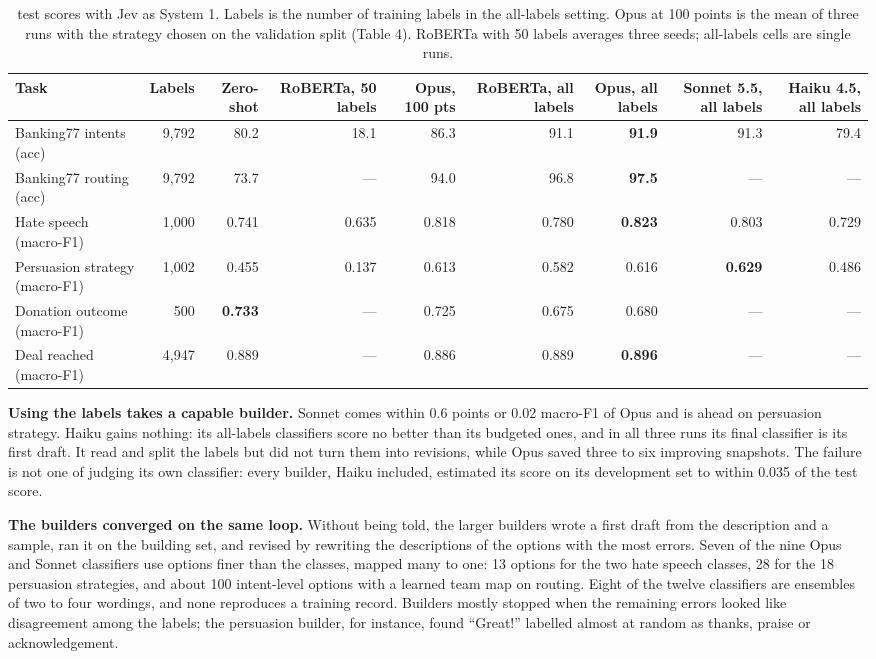 \documentclass[11pt]{article}
\begin{document}
\begin{table}[t]
\centering\small\setlength{\tabcolsep}{3.5pt}
\begin{tabularx}{\textwidth}{lRRRRRRRR}
\toprule
Task & Labels & Zero-shot & RoBERTa, 50 labels & Opus, 100 pts & RoBERTa, all labels & Opus, all labels & Sonnet 5.5, all labels & Haiku 4.5, all labels \\
\midrule
Banking77 intents (acc) & 9,792 & 80.2 & 18.1 & 86.3 & 91.1 & \textbf{91.9} & 91.3 & 79.4 \\
Banking77 routing (acc) & 9,792 & 73.7 & --- & 94.0 & 96.8 & \textbf{97.5} & --- & --- \\
Hate speech (macro-F1) & 1,000 & 0.741 & 0.635 & 0.818 & 0.780 & \textbf{0.823} & 0.803 & 0.729 \\
Persuasion strategy (macro-F1) & 1,002 & 0.455 & 0.137 & 0.613 & 0.582 & 0.616 & \textbf{0.629} & 0.486 \\
Donation outcome (macro-F1) & 500 & \textbf{0.733} & --- & 0.725 & 0.675 & 0.680 & --- & --- \\
Deal reached (macro-F1) & 4,947 & 0.889 & --- & 0.886 & 0.889 & \textbf{0.896} & --- & --- \\
\bottomrule
\end{tabularx}
\caption{test scores with Jev as System 1. Labels is the number of training labels in the all-labels setting. Opus at 100 points is the mean of three runs with the strategy chosen on the validation split (Table 4). RoBERTa with 50 labels averages three seeds; all-labels cells are single runs.}
\label{tab:2}
\end{table}

\textbf{Using the labels takes a capable builder.} Sonnet comes within 0.6 points or 0.02 macro-F1 of Opus and is ahead on persuasion strategy. Haiku gains nothing: its all-labels classifiers score no better than its budgeted ones, and in all three runs its final classifier is its first draft. It read and split the labels but did not turn them into revisions, while Opus saved three to six improving snapshots. The failure is not one of judging its own classifier: every builder, Haiku included, estimated its score on its development set to within 0.035 of the test score.

\textbf{The builders converged on the same loop.} Without being told, the larger builders wrote a first draft from the description and a sample, ran it on the building set, and revised by rewriting the descriptions of the options with the most errors. Seven of the nine Opus and Sonnet classifiers use options finer than the classes, mapped many to one: 13 options for the two hate speech classes, 28 for the 18 persuasion strategies, and about 100 intent-level options with a learned team map on routing. Eight of the twelve classifiers are ensembles of two to four wordings, and none reproduces a training record. Builders mostly stopped when the remaining errors looked like disagreement among the labels; the persuasion builder, for instance, found ``Great!'' labelled almost at random as thanks, praise or acknowledgement.
\end{document}
